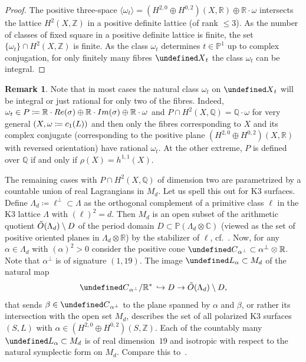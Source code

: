 \documentclass[11pt]{article}
\theoremstyle{definition}
\newtheorem{rema}[theo]{Remark}
\numberwithin{equation}{section}
\numberwithin{figure}{section}
\numberwithin{table}{section}
\let\cal\undefined
\newcommand{\OO}{{\rm O}}
\newcommand{\cal}{\mathcal}
\newcommand{\kc}{{\cal C}}
\newcommand{\kl}{{\cal L}}
\newcommand{\kx}{{\cal X}}
\newcommand{\ZZ}{\mathbb{Z}}
\newcommand{\QQ}{\mathbb{Q}}
\newcommand{\RR}{\mathbb{R}}
\newcommand{\CC}{\mathbb{C}}
\newcommand{\PP}{\mathbb{P}}
\begin{document}
\begin{proof}
The positive three-space $\langle\omega_t\rangle=(H^{2,0}\oplus H^{0,2})(X,\RR)\oplus\RR\cdot\omega$ intersects the lattice $H^2(X,\ZZ)$ in a positive definite lattice (of rank $\leq 3$). As the number of classes of fixed square in a positive definite lattice is finite, the set $\{\omega_t\}\cap H^2(X,\ZZ)$ is finite. As the class $\omega_t$ determines $t\in\PP^1$ up to complex conjugation, for only finitely many fibres $\kx_t$ the class $\omega_t$ can be integral.
\end{proof}

\begin{rema}\label{rem:Lagr}
Note that in most cases the natural class $\omega_t$ on $\kx_t$ will be integral or just rational for only two of the fibres. Indeed, $\omega_t\in P\coloneqq
\RR\cdot{\rm Re}(\sigma)\oplus\RR\cdot{\rm Im}(\sigma)\oplus\RR\cdot\omega$ and $P\cap H^2(X,\QQ)=\QQ\cdot\omega$ for very general $(X,\omega\coloneqq{\rm c}_1(L))$ and then only the fibres corresponding to $X$ and its complex conjugate (corresponding to the positive plane $(H^{2,0}\oplus H^{0,2})(X,\RR)$ with reversed orientation) have rational $\omega_t$. At the other extreme, $P$ is defined over $\QQ$ if and only if $\rho(X)=h^{1,1}(X)$.

The remaining cases with $P\cap H^2(X,\QQ)$ of dimension two are parametrized by a countable union of real Lagrangians in $M_d$. Let us spell this out for K3 surfaces. Define $\Lambda_d\coloneqq \ell^\perp\subset\Lambda$ as the orthogonal complement of a primitive class $\ell$ in the K3 lattice $\Lambda$ with $(\ell)^2=d$. Then $M_d$ is an open subset of the arithmetic quotient $\tilde\OO(\Lambda_d)\setminus D$ of the period domain $D\subset\PP(\Lambda_d\otimes\CC)$ (viewed as the set of positive oriented planes in $\Lambda_d\otimes\RR$) by the stabilizer of $\ell$, cf.~\cite[Chapter~6]{HuyK3}. Now, for any $\alpha\in\Lambda_d$ with $(\alpha)^2>0$ consider the positive cone $\kc_{\alpha^\perp}\subset\alpha^\perp\otimes\RR$. Note that $\alpha^\perp$ is of signature $(1,19)$. The image $\kl_\alpha\subset M_d$ of the natural map
\[
\kc_{\alpha^\perp}/\RR^*\,\hookrightarrow D\to \tilde\OO(\Lambda_d)\setminus D,
\]
that sends $\beta\in\kc_{\alpha^\perp}$ to the plane spanned by $\alpha$ and $\beta$, or rather its intersection with the open set $M_d$, describes the set of all polarized K3 surfaces $(S,L)$ with $\alpha\in (H^{2,0}\oplus H^{0,2})(S,\ZZ)$. Each of the countably many $\kl_\alpha\subset M_d$ is of real dimension~$19$ and isotropic with respect to the natural symplectic form on $M_d$. Compare this to~\cite[Remark~5.7]{BL}.
\end{rema}
\end{document}
